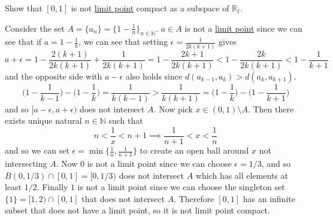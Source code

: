   \begin{exercise}[Munkres 28.2]
    Show that $[0, 1]$ is not \hyperref[def:limit-point]{limit point} compact as a subspace of $\mathbb{R}_\ell$. 
  \end{exercise}
  \begin{solution}
    Consider the set $A = \{a_n\} = \{1 - \frac{1}{n} \}_{n \in \mathbb{N}}$. $a \in A$ is not a \hyperref[def:limit-point]{limit point} since we can see that if $a = 1 - \frac{1}{k}$, we can see that setting $\epsilon = \frac{1}{2k (k+1)}$ gives 
    \begin{equation}
      a + \epsilon = 1 - \frac{2(k+1)}{2k(k+1)} + \frac{1}{2k (k+1)} = 1 - \frac{2k + 1}{2k(k+1)} < 1 - \frac{2k}{2k(k+1)} < 1 - \frac{1}{k+1} 
    \end{equation}
    and the opposite side with $a - \epsilon$ also holds since $d(a_{k-1}, a_k) > d(a_k, a_{k+1})$. 
    \begin{equation}
      \bigg(1 - \frac{1}{k-1} \bigg) - \bigg(1 - \frac{1}{k} \bigg) = \frac{1}{k(k-1)} > \frac{1}{k(k+1)} = \bigg(1 - \frac{1}{k} \bigg) - \bigg(1 - \frac{1}{k+1} \bigg) 
    \end{equation}
    and so $[a - \epsilon, a + \epsilon)$ does not intersect $A$. Now pick $x \in (0, 1) \setminus A$. Then there exists unique natural $n \in \mathbb{N}$ such that 
    \begin{equation}
      n < \frac{1}{x} < n + 1 \implies \frac{1}{n+1} < x < \frac{1}{n}
    \end{equation}
    and so we can set $\epsilon = \min\{\frac{1}{n}, \frac{1}{n+1}\}$ to create an open ball around $x$ not intersecting $A$. Now $0$ is not a limit point since we can choose $\epsilon = 1/3$, and so $B(0, 1/3) \cap [0, 1] = [0, 1/3)$ does not intersect $A$ which has all elements at least $1/2$. Finally $1$ is not a limit point since we can choose the singleton set $\{1\} = [1, 2) \cap [0, 1]$ that does not intersect $A$. Therefore $[0, 1]$ has an infinite subset that does not have a limit point, so it is not limit point compact. 
  \end{solution}


